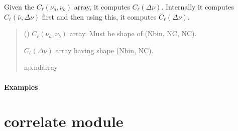\documentclass[a4paper,11pt,oneside,english,openany]{sphinxmanual}
\begin{document}
\begin{fulllineitems}
\label{\detokenize{clfuncs:clfuncs.cl_dnu_nua_nub}}
\pysigstartsignatures
{}
\pysigstopsignatures
\sphinxAtStartPar
Given the  \(C_{\ell}(\nu_a,\nu_b)\) array, it computes \(C_{\ell}(\Delta\nu)\).
Internally  it computes \(C_{\ell}(\bar{\nu},\Delta\nu)\) first and then using this, it computes \(C_{\ell}(\Delta\nu)\).
\begin{quote}\begin{description}
\sphinxAtStartPar
{} () \textendash{}  \(C_{\ell}(\nu_a,\nu_b)\) array. Must be shape of (Nbin, NC, NC).

\sphinxAtStartPar
\(C_{\ell}(\Delta\nu)\) array having shape (Nbin, NC).

\sphinxAtStartPar
np.ndarray

\end{description}\end{quote}
\subsubsection*{Examples}

\begin{sphinxVerbatim}[commandchars=\\\{\}]
  
\end{sphinxVerbatim}

\end{fulllineitems}


\sphinxstepscope


\chapter{correlate module}
\label{\detokenize{correlate:module-correlate}}\label{\detokenize{correlate:correlate-module}}\label{\detokenize{correlate::doc}}
\end{document}
